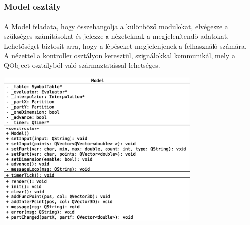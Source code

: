 \documentclass[12pt]{report}
\begin{document}
\subsubsection{Model osztály}
\paragraph{}
A Model feladata, hogy összehangolja a különböző modulokat, elvégezze a szükséges számításokat és jelezze a nézeteknak a megjelenítendő adatokat. Lehetőséget biztosít arra, hogy a lépéseket megjelenjenek a felhasználó számára. A nézettel a kontroller osztályon keresztül, szignálokkal kommunikál, mely a QObject osztályból való származtatással lehetséges.
\begin{center}
\includegraphics[width=10cm]{pics/uml/Model}
\end{center}
\end{document}
